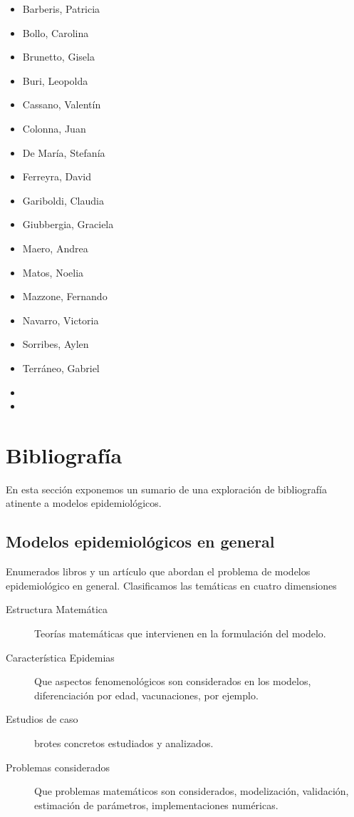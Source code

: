 \documentclass{article}
\begin{document}
\begin{itemize}
	\item  Barberis, Patricia
	\item  Bollo, Carolina
	\item  Brunetto, Gisela
	\item  Buri, Leopolda
	\item  Cassano, Valentín
	\item  Colonna, Juan
	\item  De María, Stefanía
	\item  Ferreyra, David
	\item  Gariboldi, Claudia
	\item  Giubbergia, Graciela
	\item  Maero, Andrea
	\item  Matos, Noelia
	\item  Mazzone, Fernando
	\item Navarro, Victoria
	\item  Sorribes, Aylen
	\item Terráneo, Gabriel
	 	\item 
	 
	  	\item 
\end{itemize}



\section{Bibliografía}

En esta sección exponemos un sumario de una exploración  de bibliografía atinente a modelos epidemiológicos.

\subsection{Modelos epidemiológicos en general}

Enumerados libros y un artículo que abordan el problema de modelos epidemiológico en general. Clasificamos las temáticas en cuatro dimensiones
\begin{description}
 \item[Estructura Matemática] Teorías matemáticas que intervienen en la formulación del modelo. 
 \item[Característica Epidemias] Que aspectos fenomenológicos son considerados en los modelos, diferenciación por edad, vacunaciones,  por ejemplo.
 \item[Estudios de caso] brotes concretos estudiados y analizados. 
 \item[Problemas considerados] Que problemas matemáticos son considerados, modelización, validación, estimación de parámetros, implementaciones numéricas. 
\end{description}
\end{document}

